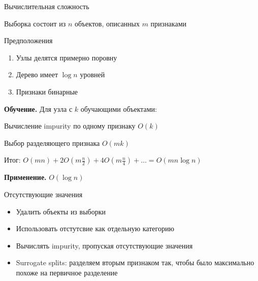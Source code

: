 \documentclass[10pt]{beamer}
\begin{document}
\begin{frame}{Вычислительная сложность}

Выборка состоит из $n$ объектов, описанных $m$ признаками

\vspace{1em}
Предположения
\begin{enumerate}
\item Узлы делятся примерно поровну
\item Дерево имеет $\log n$ уровней
\item Признаки бинарные
\end{enumerate}

\vspace{1em}
{\bf Обучение. } Для узла с $k$ обучающими объектами:

\vspace{1em}
\hspace{1em}Вычисление impurity по одному признаку $O(k)$

\hspace{1em}Выбор разделяющего признака $O(mk)$ 

\hspace{1em}Итог: $O(mn) + 2 O(m \frac{n}{2}) + 4 O(m \frac{n}{4}) + \ldots = O(m n \log n)$

\vspace{1em}
{\bf Применение. } $O(\log n)$

\end{frame}

\begin{frame}{Отсутствующие значения}

\begin{itemize}
\item Удалить объекты из выборки
\item Использовать отстутсвие как отдельную категорию
\item Вычислять impurity, пропуская отсутствующие значения
\item Surrogate splits: разделяем вторым признаком так, чтобы было максимально похоже на первичное разделение
\end{itemize}

\end{frame}
\end{document}
